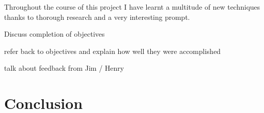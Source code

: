 \documentclass[11pt,a4paper,titlepage]{report}
\begin{document}





    
    Throughout the course of this project I have learnt a multitude of new techniques thanks to thorough research and a very interesting prompt.

    Discuss completion of objectives

	refer back to objectives and explain how well they were accomplished
	
	talk about feedback from Jim / Henry












\chapter{Conclusion}



	\newpage

	\printbibliography{}
\end{document}
